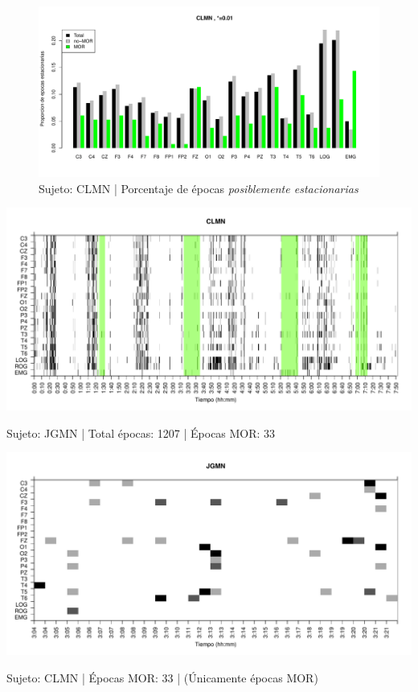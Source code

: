 \begin{figure}
\centering
\includegraphics[width=\linewidth]
{./material_bonito170220/porcentaje_bis/CLMN10SUE_132_944_1_bar_porcentaje.pdf} 
\caption{Sujeto: CLMN | Porcentaje de \'epocas \textit{posiblemente estacionarias}}
\end{figure}


\begin{SidewaysFigure}
\centering
\includegraphics[width=\linewidth]
{./material_bonito170220/CLMN10SUE_132_mor132_tot944_est_total.pdf} 
\caption{Sujeto: JGMN | Total \'epocas: 1207 | \'Epocas MOR: 33}
\end{SidewaysFigure}
\begin{SidewaysFigure}
\centering
\includegraphics[width=\linewidth]
{./material_bonito170220/JGMN6SUE_33_mor33_tot33_est_mor.pdf} 
\caption{Sujeto: CLMN | \'Epocas MOR: 33 | (\'Unicamente \'epocas MOR)}
\end{SidewaysFigure}

